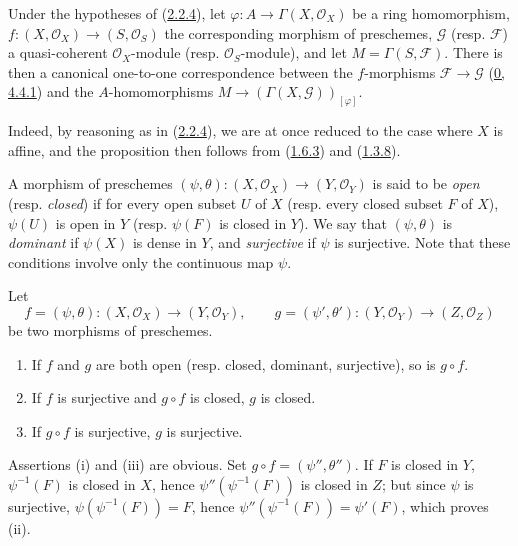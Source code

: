 \begin{proposition}[2.2.5]
\label{I.2.2.5}
Under the hypotheses of (\hyperref[I.2.2.4]{2.2.4}), let
$\varphi:A\to\Gamma(X,\mathscr{O}_X)$ be a ring homomorphism,
$f:(X,\mathscr{O}_X)\to(S,\mathscr{O}_S)$ the corresponding morphism of
preschemes, $\mathscr{G}$ (resp. $\mathscr{F}$) a quasi-coherent
$\mathscr{O}_X$-module (resp. $\mathscr{O}_S$-module), and
let $M=\Gamma(S,\mathscr{F})$. There is then a
canonical one-to-one correspondence between the $f$-morphisms
$\mathscr{F}\to\mathscr{G}$ (\hyperref[0.4.4.1]{0, 4.4.1}) and the
$A$-homomorphisms
$M\to(\Gamma(X,\mathscr{G}))_{[\varphi]}$.
\end{proposition}

Indeed, by reasoning as in (\hyperref[I.2.2.4]{2.2.4}), we are at once
reduced to the case where $X$ is affine, and the proposition then follows
from (\hyperref[I.1.6.3]{1.6.3}) and (\hyperref[I.1.3.8]{1.3.8}).

\begin{env}[2.2.6]
\label{I.2.2.6}
A morphism of preschemes
$(\psi,\theta):(X,\mathscr{O}_X)\to(Y,\mathscr{O}_Y)$ is said to be
\emph{open} (resp. \emph{closed}) if for every open subset $U$ of $X$ (resp.
every closed subset $F$ of $X$), $\psi(U)$ is open in $Y$ (resp. $\psi(F)$
is closed in $Y$). We say that $(\psi,\theta)$ is \emph{dominant} if
$\psi(X)$ is dense in $Y$, and \emph{surjective} if $\psi$ is surjective.
Note that these conditions involve only the continuous map $\psi$.
\end{env}

\begin{proposition}[2.2.7]
\label{I.2.2.7}
Let
\[
  f=(\psi,\theta):(X,\mathscr{O}_X)\to(Y,\mathscr{O}_Y),
  \qquad
  g=(\psi',\theta'):(Y,\mathscr{O}_Y)\to(Z,\mathscr{O}_Z)
\]
be two morphisms of preschemes.
\begin{enumerate}
  \item[\rm(i)] If $f$ and $g$ are both open (resp. closed, dominant,
    surjective), so is $g\circ f$.
  \item[\rm(ii)] If $f$ is surjective and $g\circ f$ is closed, $g$ is
    closed.
  \item[\rm(iii)] If $g\circ f$ is surjective, $g$ is surjective.
\end{enumerate}
\end{proposition}

Assertions (i) and (iii) are obvious. Set
$g\circ f=(\psi'',\theta'')$. If $F$ is closed in $Y$,
$\psi^{-1}(F)$ is closed in $X$, hence
$\psi''(\psi^{-1}(F))$ is closed in $Z$; but since $\psi$ is surjective,
$\psi(\psi^{-1}(F))=F$, hence
$\psi''(\psi^{-1}(F))=\psi'(F)$, which proves (ii).

